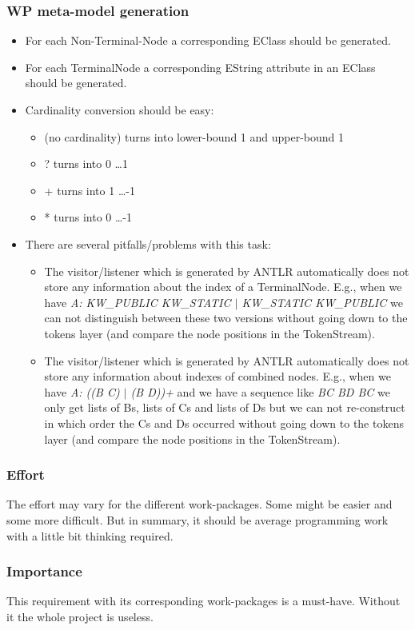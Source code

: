 \subsubsection{WP meta-model generation}
\begin{itemize}
	\item For each Non-Terminal-Node a corresponding EClass 
	should be generated.
	\item For each TerminalNode a corresponding EString
	attribute in an EClass should be generated.
	\item Cardinality conversion should be easy:
	\begin{itemize}
		\item (no cardinality) turns into lower-bound 1 and upper-bound 1
		\item ? turns into 0 \dots 1
		\item + turns into 1 \dots -1
		\item * turns into 0 \dots -1
	\end{itemize}
	\item There are several pitfalls/problems with this task:
	\begin{itemize}
		\item The visitor/listener which is generated by ANTLR automatically
		does not store any information about the index of a TerminalNode.
		E.g., when we have {\it A: KW\_PUBLIC KW\_STATIC $|$ KW\_STATIC KW\_PUBLIC}
		we can not distinguish between these two versions without going
		down to the tokens layer (and compare the node positions in the 
		TokenStream).
		\item The visitor/listener which is generated by ANTLR automatically
		does not store any information about indexes of combined nodes.
		E.g., when we have {\it A: ((B C) $|$ (B D))+}
		and we have a sequence like {\it BC BD BC}
		we only get lists of Bs, lists of Cs and lists of Ds but we
		can not re-construct in which order the Cs and Ds occurred without
		going down to the tokens layer (and compare the node positions 
		in the TokenStream).
	\end{itemize} 
\end{itemize}
\subsubsection{Effort}
The effort may vary for the different work-packages.
Some might be easier and some more difficult.
But in summary, it should be average programming work
with a little bit thinking required.
\subsubsection{Importance}
This requirement with its corresponding work-packages
is a must-have. Without it the whole project is useless.

